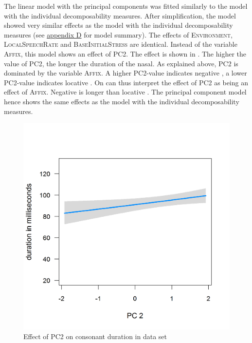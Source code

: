 The linear model with the principal components was fitted similarly to the model with the individual decomposability measures. After simplification, the model showed very similar effects as the model with the individual decomposability measures (see \hyperref[Appendix D: model summaries corpus]{appendix D} for model summary). The effects of \textsc{Environment}, \textsc{LocalSpeechRate} and \textsc{BaseInitialStress} are identical. Instead of the variable \textsc{Affix}, this model shows an effect of \textsc{PC2}. The effect is shown in . The higher the value of \textsc{PC2}, the longer the duration of the nasal. As explained above, \textsc{PC2} is dominated by the variable \textsc{Affix}. A higher \textsc{PC2}-value indicates negative , a lower \textsc{PC2}-value indicates locative . On can thus interpret the effect of \textsc{PC2} as being an effect of \textsc{Affix}. Negative  is longer than locative . The principal component model hence shows the same effects as the model with the individual decomposability measures.


\begin{figure} [h!]
	\centering
	\includegraphics [scale=0.4] {images/Corpus/imPCAbsPC2.png}
	\caption{Effect of PC2 on consonant duration in data set}
	\label{fig:PC2 in Corpus}
\end{figure}



